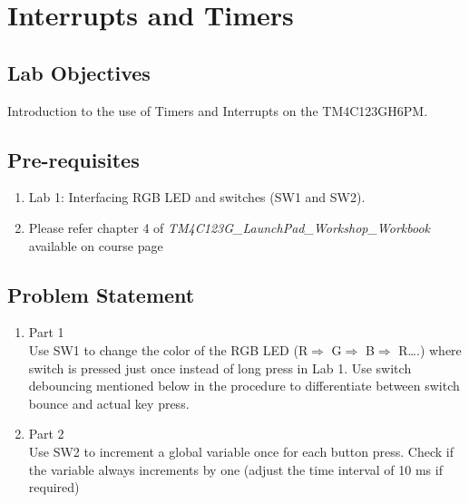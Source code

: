 \documentclass[a4paper,12pt,oneside]{book}
\begin{document}
\newpage
\chapter{Interrupts and Timers}
\section{Lab Objectives}
Introduction to the use of Timers and Interrupts on the TM4C123GH6PM.
\section{Pre-requisites}
\begin{enumerate}
\item 
Lab 1: Interfacing RGB LED and switches (SW1 and SW2).
\item Please refer chapter 4 of \textit{TM4C123G\_LaunchPad\_Workshop\_Workbook} available on course page

\end{enumerate}
\section{Problem Statement}
\begin{enumerate}
\item Part 1 \\
Use SW1 to change the color of the RGB LED (R$\Rightarrow$ G$\Rightarrow$ B$\Rightarrow$ R….) where switch is pressed just once instead of long press in Lab 1. Use switch debouncing mentioned below in the procedure to differentiate between switch bounce and actual key press.
\item Part 2 \\
Use SW2 to increment a global variable once for each button press. Check if the variable always increments by one (adjust the time interval of 10 ms if required)
\end{enumerate}
 
\end{document}
